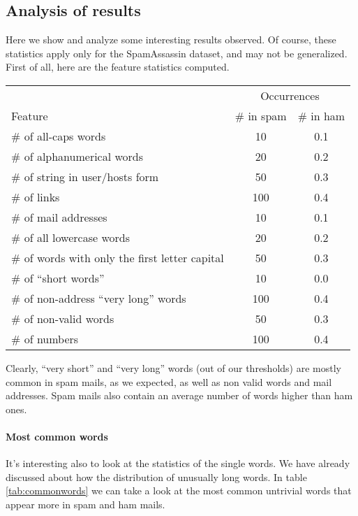 \subsection{Analysis of results}
Here we show and analyze some interesting results observed. Of course, these statistics apply only for the SpamAssassin dataset, and may not be generalized. First of all, here are the feature statistics computed.

\begin{center}
\begin{tabular}{lcc}
\toprule
& \multicolumn{2}{c}{Occurrences} \\
\cmidrule(r){2-3}
Feature & \# in spam & \# in ham \\
\midrule
\# of all-caps words                            & 10    & 0.1 \\
\# of alphanumerical words                      & 20    & 0.2 \\
\# of string in user/hosts form                 & 50    & 0.3 \\
\# of links                                     & 100   & 0.4 \\
\# of mail addresses                            & 10    & 0.1 \\
\# of all lowercase words                       & 20    & 0.2 \\
\# of words with only the first letter capital  & 50    & 0.3 \\
\# of ``short words''                           & 10    & 0.0 \\
\# of non-address ``very long'' words           & 100   & 0.4 \\
\# of non-valid words                           & 50    & 0.3 \\
\# of numbers                                   & 100   & 0.4 \\
\bottomrule
\end{tabular}
\end{center}

Clearly, ``very short'' and ``very long'' words (out of our thresholds) are mostly common in spam mails, as we expected, as well as non valid words and mail addresses. Spam mails also contain an average number of words higher than ham ones.

\paragraph{Most common words}
It's interesting also to look at the statistics of the single words. We have already discussed about how the distribution of unusually long words. In table \ref{tab:commonwords} we can take a look at the most common untrivial words that appear more in spam and ham mails.

